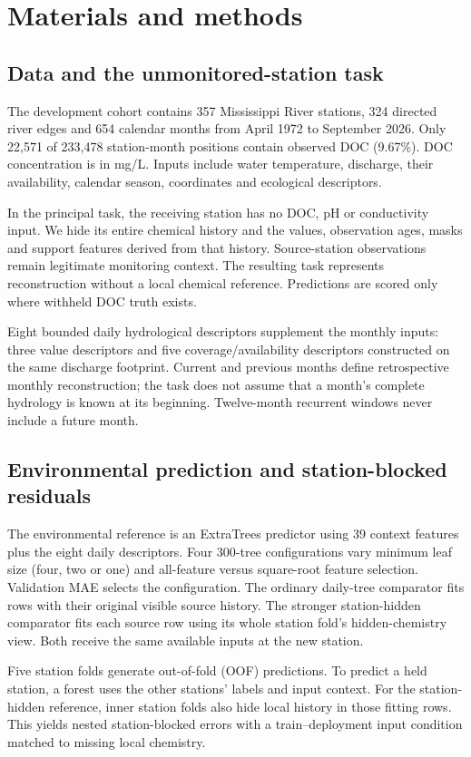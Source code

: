 \documentclass[11pt]{article}
\begin{document}
\section{Materials and methods}
\subsection{Data and the unmonitored-station task}
The development cohort contains 357 Mississippi River stations, 324 directed river edges and 654 calendar months from April 1972 to September 2026. Only 22,571 of 233,478 station-month positions contain observed DOC (9.67\%). DOC concentration is in mg/L. Inputs include water temperature, discharge, their availability, calendar season, coordinates and ecological descriptors.

In the principal task, the receiving station has no DOC, pH or conductivity input. We hide its entire chemical history and the values, observation ages, masks and support features derived from that history. Source-station observations remain legitimate monitoring context. The resulting task represents reconstruction without a local chemical reference. Predictions are scored only where withheld DOC truth exists.

Eight bounded daily hydrological descriptors supplement the monthly inputs: three value descriptors and five coverage/availability descriptors constructed on the same discharge footprint. Current and previous months define retrospective monthly reconstruction; the task does not assume that a month's complete hydrology is known at its beginning. Twelve-month recurrent windows never include a future month.

\subsection{Environmental prediction and station-blocked residuals}
The environmental reference is an ExtraTrees predictor using 39 context features plus the eight daily descriptors. Four 300-tree configurations vary minimum leaf size (four, two or one) and all-feature versus square-root feature selection. Validation MAE selects the configuration. The ordinary daily-tree comparator fits rows with their original visible source history. The stronger station-hidden comparator fits each source row using its whole station fold's hidden-chemistry view. Both receive the same available inputs at the new station.

Five station folds generate out-of-fold (OOF) predictions. To predict a held station, a forest uses the other stations' labels and input context. For the station-hidden reference, inner station folds also hide local history in those fitting rows. This yields nested station-blocked errors with a train--deployment input condition matched to missing local chemistry.
\end{document}
